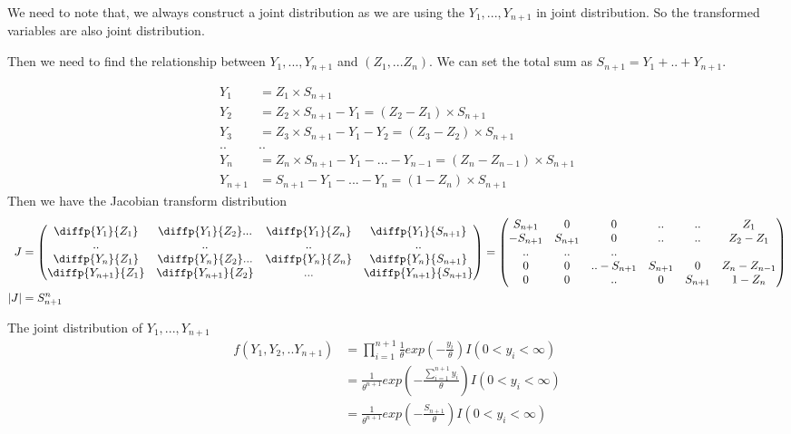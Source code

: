 We need to note that, we always construct a joint distribution as we are using the $Y_1, ..., Y_{n+1}$ in joint distribution. So the transformed variables are also joint distribution.

Then we need to find the relationship between $Y_1, ..., Y_{n+1}$ and $(Z_1, ... Z_n)$. We can set the total sum as $S_{n+1} = Y_1+ .. + Y_{n+1}$.

\begin{align*}
	Y_1 &= Z_1 \times S_{n+1} \\
	Y_2 &= Z_2 \times S_{n+1} - Y_1 = (Z_2  - Z_1) \times S_{n+1}\\
	Y_3 &= Z_3 \times S_{n+1} - Y_1 - Y_2 = (Z_3  - Z_2) \times S_{n+1}\\
	.. & ..\\
	Y_n &= Z_n \times S_{n+1} - Y_1 - ...- Y_{n-1} = (Z_n  - Z_{n-1}) \times S_{n+1}\\
	Y_{n+1} &= S_{n+1} - Y_1 - ...- Y_{n} = (1- Z_n)  \times S_{n+1}
\end{align*}
Then we have the Jacobian transform distribution
\begin{align*}
	J &= \begin{pmatrix}
		\diffp{Y_1}{{Z_1}} & \diffp{Y_1}{{Z_2}} ... & \diffp{Y_1}{{Z_n}} & \diffp{Y_1}{{S_{n+1}}}\\
		..& ..& ..& ..\\
		\diffp{Y_n}{{Z_1}} & \diffp{Y_n}{{Z_2}}  ... & \diffp{Y_n}{{Z_n}} & \diffp{Y_n}{{S_{n+1}}}\\
		\diffp{Y_{n+1}}{{Z_1}} & \diffp{Y_{n+1}}{{Z_2}} & ...& \diffp{Y_{n+1}}{{S_{n+1}}}
	\end{pmatrix} =  \begin{pmatrix}
		S_{n+1} & 0 & 0 &.. & ..& Z_1  \\
		-S_{n+1} & S_{n+1} & 0 &.. &..& Z_2- Z_1  \\
		.. & .. & .. \\
		0 & 0&.. -S_{n+1} & S_{n+1}  &0 & Z_{n}- Z_{n-1}  \\
		0 & 0 &..& 0 & S_{n+1}& 1- Z_n\\
	\end{pmatrix}\\
	|J| &= S_{n+1}^{n}
\end{align*}

The joint distribution of $Y_1, ..., Y_{n+1}$
\begin{align*}
	f(Y_1, Y_2,.. Y_{n+1}) &= \prod_{i=1}^{n+1} \frac{1}{\theta} exp(-\frac{y_i}{\theta}) I(0< y_i < \infty) \\
	&= \frac{1}{\theta^{n+1}} exp(-\frac{\sum_{i=1}^{n+1} y_i}{\theta}) I(0< y_i < \infty)\\
	&= \frac{1}{\theta^{n+1}} exp(-\frac{S_{n+1}}{\theta}) I(0< y_i < \infty)
\end{align*}

